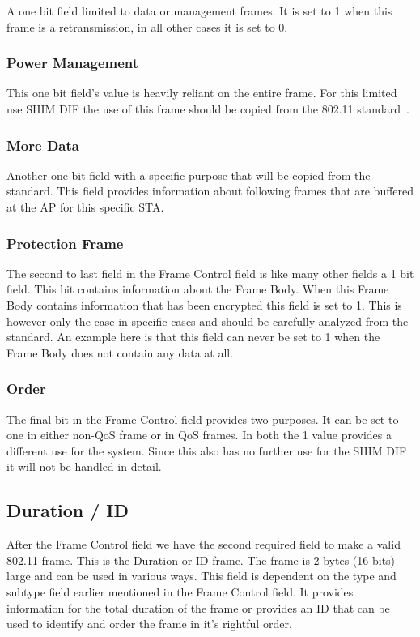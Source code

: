 A one bit field limited to data or management frames. It is set to 1 when this frame is a retransmission, in all other cases it is set to 0.

\subsubsection{Power Management}

This one bit field's value is heavily reliant on the entire frame. For this limited use SHIM DIF the use of this frame should be copied from the 802.11 standard~\citep{ieee80211std}.

\subsubsection{More Data}

Another one bit field with a specific purpose that will be copied from the standard. This field provides information about following frames that are buffered at the AP for this specific STA.

\subsubsection{Protection Frame}

The second to last field in the Frame Control field is like many other fields a 1 bit field. This bit contains information about the Frame Body. When this Frame Body contains information that has been encrypted this field is set to 1. This is however only the case in specific cases and should be carefully analyzed from the standard. An example here is that this field can never be set to 1 when the Frame Body does not contain any data at all.

\subsubsection{Order}

The final bit in the Frame Control field provides two purposes. It can be set to one in either non-QoS frame or in QoS frames. In both the 1 value provides a different use for the system. Since this also has no further use for the SHIM DIF it will not be handled in detail.

\subsection{Duration / ID}

After the Frame Control field we have the second required field to make a valid 802.11 frame. This is the Duration or ID frame. The frame is 2 bytes (16 bits) large and can be used in various ways. This field is dependent on the type and subtype field earlier mentioned in the Frame Control field. It provides information for the total duration of the frame or provides an ID that can be used to identify and order the frame in it's rightful order. 

